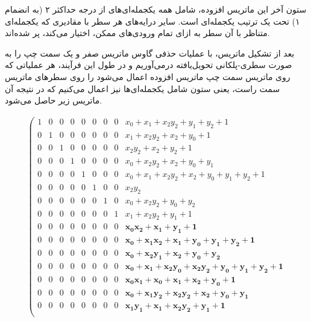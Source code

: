 		ستون آخر این ماتریس  افزوده،  شامل همه یکجمله‌ای‌های از درجه حداکثر ۲ (به انضمام ۱)  تحت یک ترتیب یکجمله‌ای  است. سایر درایه‌های هر سطر با مقادیری که یکجمله‌ای متناظر با آن سطر به ازای تمام ورودی‌های ممکن، اختیار می‌کند، پر شده‌اند.  
		
		بعد از تشکیل ماتریس،  با عملیات حذفی گاوس ماتریس صفر و یک سمت چپ را به صورت سطری-پلکانی تحویل‌یافته درمی‌آوریم و در طول این فرآیند، هر عملیاتی که روی ماتریس سمت چپ ماتریس افزوده اعمال می‌شود را روی سطرهای ماتریس سمت راست، یعنی ستون شامل یکجمله‌ای‌ها نیز اعمال می‌کنیم که در نتیجه آن ماتریس زیر حاصل می‌شود. 
		\begin{scriptsize}
			\begin{align*}
			\left(\begin{array}{rrrrrrrrr}
			1 & 0 & 0 & 0 & 0 & 0 & 0 & 0 & x_{0} + x_{1} + x_{2} y_{2} + y_{1} + y_{2} + 1 \\
			0 & 1 & 0 & 0 & 0 & 0 & 0 & 0 & x_{1} + x_{2} y_{2} + x_{2} + y_{0} + 1 \\
			0 & 0 & 1 & 0 & 0 & 0 & 0 & 0 & x_{2} y_{2} + x_{2} + y_{2} + 1 \\
			0 & 0 & 0 & 1 & 0 & 0 & 0 & 0 & x_{0} + x_{2} y_{2} + x_{2} + y_{0} + y_{1} \\
			0 & 0 & 0 & 0 & 1 & 0 & 0 & 0 & x_{0} + x_{1} + x_{2} y_{2} + x_{2} + y_{0} + y_{1} + y_{2} + 1 \\
			0 & 0 & 0 & 0 & 0 & 1 & 0 & 0 & x_{2} y_{2} \\
			0 & 0 & 0 & 0 & 0 & 0 & 1 & 0 & x_{0} + x_{2} y_{2} + y_{0} + y_{2} \\
			0 & 0 & 0 & 0 & 0 & 0 & 0 & 1 & x_{1} + x_{2} y_{2} + y_{1} + 1 \\
			0 & 0 & 0 & 0 & 0 & 0 & 0 & 0 & \mathbf{x_{0} x_{2} + x_{1} + y_{1} + 1} \\
			0 & 0 & 0 & 0 & 0 & 0 & 0 & 0 & \mathbf{x_{0} + x_{1} x_{2} + x_{1} + y_{0} + y_{1} + y_{2} + 1} \\
			0 & 0 & 0 & 0 & 0 & 0 & 0 & 0 & \mathbf{x_{0} + x_{2} y_{1} + x_{2} + y_{0} + y_{2}} \\
			0 & 0 & 0 & 0 & 0 & 0 & 0 & 0 & \mathbf{x_{0} + x_{1} + x_{2} y_{0} + x_{2} y_{2} + y_{0} + y_{1} + y_{2} + 1} \\
			0 & 0 & 0 & 0 & 0 & 0 & 0 & 0 & \mathbf{x_{0} x_{1} + x_{0} + x_{1} + x_{2} + y_{0} + 1} \\
			0 & 0 & 0 & 0 & 0 & 0 & 0 & 0 & \mathbf{x_{0} + x_{1} y_{2} + x_{2} y_{2} + x_{2} + y_{0} + y_{1}} \\
			0 & 0 & 0 & 0 & 0 & 0 & 0 & 0 & \mathbf{x_{1} y_{1} + x_{1} + x_{2} y_{2} + y_{1} + 1} \\

\end{array}
\end{align*}
\end{scriptsize}
